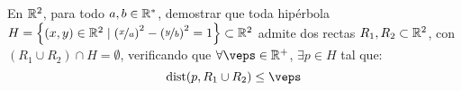 \documentclass[12pt]{article}
\begin{document}
    \begin{ejercicio}[3 puntos]
        En $\mathbb{R}^2$, para todo $a,b\in \mathbb{R}^\ast$, demostrar que toda hipérbola $H=\left\{(x,y)\in \mathbb{R}^2\mid \left(\nicefrac{x}{a}\right)^2-\left(\nicefrac{y}{b}\right)^2=1\right\}\subset \mathbb{R}^2$ admite dos rectas $R_1,R_2\subset \mathbb{R}^2$, con $(R_1\cup R_2)\cap H=\emptyset$, verificando que $\forall \veps\in \bb{R}^+$, $\exists p\in H$ tal que:
        \begin{equation*}
            \text{dist}(p,R_1\cup R_2)\leq \veps
        \end{equation*}
    \end{ejercicio}
\end{document}
